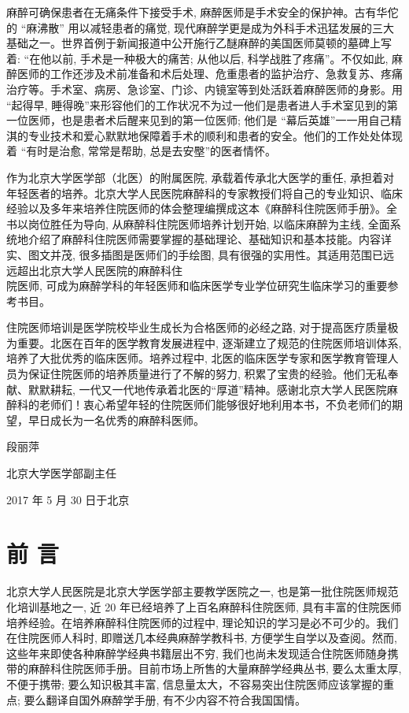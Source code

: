 \documentclass[10pt]{article}
\begin{document}
麻醉可确保患者在无痛条件下接受手术, 麻醉医师是手术安全的保护神。古有华佗的 “麻沸散” 用以减轻患者的痛觉, 现代麻醉学更是成为外科手术迅猛发展的三大基础之一。世界首例于新闻报道中公开施行乙醚麻醉的美国医师莫顿的墓碑上写着: “在他以前, 手术是一种极大的痛苦; 从他以后, 科学战胜了疼痛”。不仅如此, 麻醉医师的工作还涉及术前准备和术后处理、危重患者的监护治疗、急救复苏、疼痛治疗等。手术室、病房、急诊室、门诊、内镜室等到处活跃着麻醉医师的身影。用 “起得早, 睡得晚”来形容他们的工作状况不为过一他们是患者进人手术室见到的第一位医师，也是患者术后醒来见到的第一位医师; 他们是 “幕后英雄”一一用自己精淇的专业技术和爱心默默地保障着手术的顺利和患者的安全。他们的工作处处体现着 “有时是治愈, 常常是帮助, 总是去安壂”的医者情怀。

作为北京大学医学部（北医）的附属医院, 承载着传承北大医学的重任, 承担着对年轻医者的培养。北京大学人民医院麻醉科的专家教授们将自己的专业知识、临床经验以及多年来培养住院医师的体会整理编撰成这本《麻醉科住院医师手册》。全书以岗位胜任为导向, 从麻醉科住院医师培养计划开始, 以临床麻醉为主线, 全面系统地介绍了麻醉科住院医师需要掌握的基础理论、基础知识和基本技能。内容详实、图文并茂, 很多插图是医师们的手绘图, 具有很强的实用性。其适用范围已远远超出北京大学人民医院的麻醉科住\\
院医师, 可成为麻醉学科的年轻医师和临床医学专业学位研究生临床学习的重要参考书目。

住院医师培训是医学院校毕业生成长为合格医师的必经之路, 对于提高医疗质量极为重要。北医在百年的医学教育发展进程中, 逐渐建立了规范的住院医师培训体系, 培养了大批优秀的临床医师。培养过程中, 北医的临床医学专家和医学教育管理人员为保证住院医师的培养质量进行了不解的努力, 积累了宝贵的经验。他们无私奉献、默默耕耘, 一代又一代地传承着北医的“厚道”精神。感谢北京大学人民医院麻醉科的老师们！衷心希望年轻的住院医师们能够很好地利用本书，不负老师们的期望，早日成长为一名优秀的麻醉科医师。

段丽萍

北京大学医学部副主任

2017 年 5 月 30 日于北京

\section*{前 言}
北京大学人民医院是北京大学医学部主要教学医院之一, 也是第一批住院医师规范化培训基地之一, 近 20 年已经培养了上百名麻醉科住院医师, 具有丰富的住院医师培养经验。在培养麻醉科住院医师的过程中, 理论知识的学习是必不可少的。我们在住院医师人科时, 即赠送几本经典麻醉学教科书, 方便学生自学以及查阅。然而, 这些年来即使各种麻醉学经典书籍层出不穷, 我们也尚未发现适合住院医师随身携带的麻醉科住院医师手册。目前市场上所售的大量麻醉学经典丛书, 要么太重太厚, 不便于携带; 要么知识极其丰富, 信息量太大，不容易突出住院医师应该掌握的重点; 要么翻译自国外麻醉学手册, 有不少内容不符合我国国情。
\end{document}
